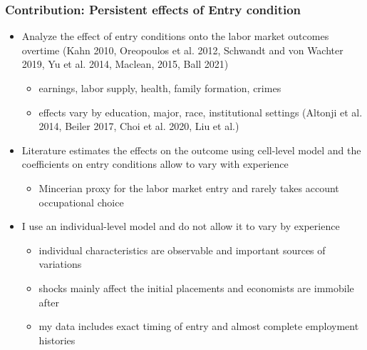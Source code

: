 \documentclass[11pt]{beamer}
\begin{document}
\begin{frame}
	\frametitle{Contribution: Persistent effects of Entry condition} 
	\begin{itemize}
		\item Analyze the effect of entry conditions onto the labor market outcomes overtime (Kahn 2010, Oreopoulos et al. 2012, Schwandt and von Wachter 2019, Yu et al. 2014,  Maclean, 2015, Ball 2021)
		\begin{itemize}
			\item earnings, labor supply, health, family formation, crimes
			\item effects vary by education, major, race, institutional settings (Altonji et al. 2014, Beiler 2017, Choi et al. 2020, Liu et al.)
		\end{itemize}
		\vspace{1 mm}
		\item Literature estimates the effects on the outcome using cell-level model and the coefficients on entry conditions allow to vary with experience
		\begin{itemize}
			\item Mincerian proxy for the labor market entry and rarely takes account occupational choice
		\end{itemize}
		\item I use an individual-level model and do not allow it to vary by experience
		\begin{itemize}
			\item individual characteristics are observable and important sources of variations
			\item shocks mainly affect the initial placements and economists are immobile after 
			\item my  data includes exact timing of entry and almost complete employment histories
		\end{itemize}
		
	\end{itemize}
\end{frame}
\end{document}
